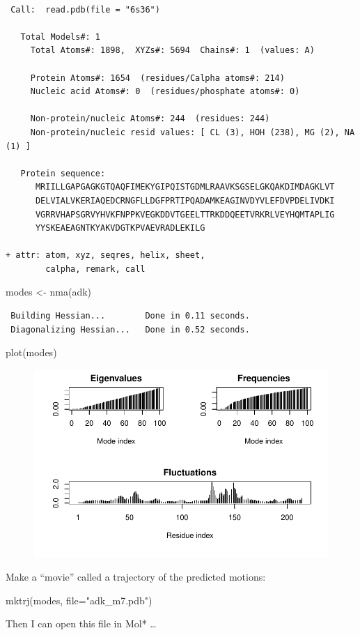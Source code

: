 \documentclass[
  letterpaper,
  DIV=11,
  numbers=noendperiod]{scrartcl}
\newenvironment{Shaded}{\begin{snugshade}}{\end{snugshade}}
\newcommand{\AttributeTok}[1]{\textcolor[rgb]{0.40,0.45,0.13}{#1}}
\newcommand{\FunctionTok}[1]{\textcolor[rgb]{0.28,0.35,0.67}{#1}}
\newcommand{\NormalTok}[1]{\textcolor[rgb]{0.00,0.23,0.31}{#1}}
\newcommand{\OtherTok}[1]{\textcolor[rgb]{0.00,0.23,0.31}{#1}}
\newcommand{\StringTok}[1]{\textcolor[rgb]{0.13,0.47,0.30}{#1}}
\begin{document}
\begin{verbatim}

 Call:  read.pdb(file = "6s36")

   Total Models#: 1
     Total Atoms#: 1898,  XYZs#: 5694  Chains#: 1  (values: A)

     Protein Atoms#: 1654  (residues/Calpha atoms#: 214)
     Nucleic acid Atoms#: 0  (residues/phosphate atoms#: 0)

     Non-protein/nucleic Atoms#: 244  (residues: 244)
     Non-protein/nucleic resid values: [ CL (3), HOH (238), MG (2), NA (1) ]

   Protein sequence:
      MRIILLGAPGAGKGTQAQFIMEKYGIPQISTGDMLRAAVKSGSELGKQAKDIMDAGKLVT
      DELVIALVKERIAQEDCRNGFLLDGFPRTIPQADAMKEAGINVDYVLEFDVPDELIVDKI
      VGRRVHAPSGRVYHVKFNPPKVEGKDDVTGEELTTRKDDQEETVRKRLVEYHQMTAPLIG
      YYSKEAEAGNTKYAKVDGTKPVAEVRADLEKILG

+ attr: atom, xyz, seqres, helix, sheet,
        calpha, remark, call
\end{verbatim}

\begin{Shaded}
\begin{Highlighting}[]
\NormalTok{modes }\OtherTok{\textless{}{-}} \FunctionTok{nma}\NormalTok{(adk)}
\end{Highlighting}
\end{Shaded}

\begin{verbatim}
 Building Hessian...        Done in 0.11 seconds.
 Diagonalizing Hessian...   Done in 0.52 seconds.
\end{verbatim}

\begin{Shaded}
\begin{Highlighting}[]
\FunctionTok{plot}\NormalTok{(modes)}
\end{Highlighting}
\end{Shaded}

\begin{figure}[H]

{\centering \includegraphics{class10_1_files/figure-pdf/unnamed-chunk-13-1.pdf}

}

\end{figure}

Make a ``movie'' called a trajectory of the predicted motions:

\begin{Shaded}
\begin{Highlighting}[]
\FunctionTok{mktrj}\NormalTok{(modes, }\AttributeTok{file=}\StringTok{"adk\_m7.pdb"}\NormalTok{)}
\end{Highlighting}
\end{Shaded}

Then I can open this file in Mol* \ldots{}
\end{document}
